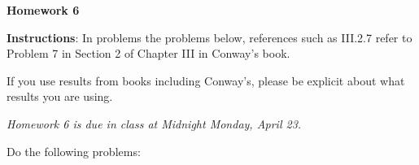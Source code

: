 \documentclass{article}%
\begin{document}
\begin{center}

\textbf{Homework 6}\bigskip

\end{center}



\noindent\textbf{Instructions}:
\noindent In problems the problems below, references such as III.2.7 refer to Problem 7 in Section 2 of Chapter III in Conway's book.\smallskip



\noindent If you use results from books including Conway's, please be explicit about what results you are using.






\begin{center}

\emph{Homework 6 is due in class at Midnight Monday, April 23.}

\end{center} 

\medskip

Do the following problems:
\end{document}
